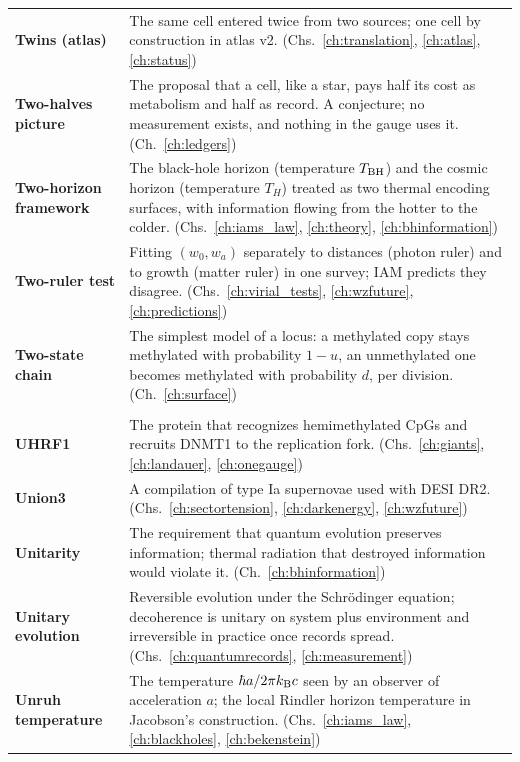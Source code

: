 {\begin{longtable}{@{}>{\raggedright\arraybackslash}p{}>{\raggedright\arraybackslash}p{}@{}}
\textbf{Twins (atlas)} & The same cell entered twice from two sources; one cell by construction in atlas v2. {\footnotesize(Chs.~\ref{ch:translation}, \ref{ch:atlas}, \ref{ch:status})}\\[1pt]
\textbf{Two-halves picture} & The proposal that a cell, like a star, pays half its cost as metabolism and half as record. A conjecture; no measurement exists, and nothing in the gauge uses it. {\footnotesize(Ch.~\ref{ch:ledgers})}\\[1pt]
\textbf{Two-horizon framework} & The black-hole horizon (temperature $T_{\rm BH}$) and the cosmic horizon (temperature $T_H$) treated as two thermal encoding surfaces, with information flowing from the hotter to the colder. {\footnotesize(Chs.~\ref{ch:iams_law}, \ref{ch:theory}, \ref{ch:bhinformation})}\\[1pt]
\textbf{Two-ruler test} & Fitting $(w_0,w_a)$ separately to distances (photon ruler) and to growth (matter ruler) in one survey; IAM predicts they disagree. {\footnotesize(Chs.~\ref{ch:virial_tests}, \ref{ch:wzfuture}, \ref{ch:predictions})}\\[1pt]
\textbf{Two-state chain} & The simplest model of a locus: a methylated copy stays methylated with probability $1-u$, an unmethylated one becomes methylated with probability $d$, per division. {\footnotesize(Ch.~\ref{ch:surface})}\\[1pt]
\multicolumn{2}{@{}l}{\normalsize\textbf{U}}\\[2pt]
\textbf{UHRF1} & The protein that recognizes hemimethylated CpGs and recruits DNMT1 to the replication fork. {\footnotesize(Chs.~\ref{ch:giants}, \ref{ch:landauer}, \ref{ch:onegauge})}\\[1pt]
\textbf{Union3} & A compilation of type Ia supernovae used with DESI DR2. {\footnotesize(Chs.~\ref{ch:sectortension}, \ref{ch:darkenergy}, \ref{ch:wzfuture})}\\[1pt]
\textbf{Unitarity} & The requirement that quantum evolution preserves information; thermal radiation that destroyed information would violate it. {\footnotesize(Ch.~\ref{ch:bhinformation})}\\[1pt]
\textbf{Unitary evolution} & Reversible evolution under the Schr\"odinger equation; decoherence is unitary on system plus environment and irreversible in practice once records spread. {\footnotesize(Chs.~\ref{ch:quantumrecords}, \ref{ch:measurement})}\\[1pt]
\textbf{Unruh temperature} & The temperature $\hbar a/2\pi k_{\mathrm B} c$ seen by an observer of acceleration $a$; the local Rindler horizon temperature in Jacobson's construction. {\footnotesize(Chs.~\ref{ch:iams_law}, \ref{ch:blackholes}, \ref{ch:bekenstein})}\\[1pt]

\end{longtable}}
